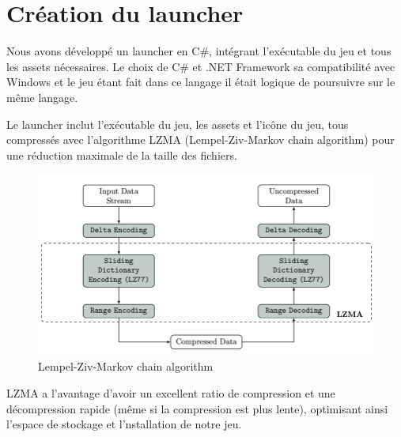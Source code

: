 \documentclass[
	article,			%
	11pt,				%
	oneside,			%
	a4paper,			%
	chapter=TITLE,
	french,			%
	sumario=tradicional
	]{base_nt}
\begin{document}
\newpage

\section{Création du launcher}

Nous avons développé un launcher en C\#, intégrant l'exécutable du jeu et tous les assets nécessaires. Le choix de C\# et .NET Framework sa compatibilité avec Windows et le jeu étant fait dans ce langage il était logique de poursuivre sur le même langage.

Le launcher inclut l'exécutable du jeu, les assets et l'icône du jeu, tous compressés avec l'algorithme LZMA (Lempel-Ziv-Markov chain algorithm) pour une réduction maximale de la taille des fichiers. 

\begin{figure}[ht]
	\caption{Lempel-Ziv-Markov chain
algorithm}
	\centering
	\includegraphics[width=1\linewidth]{paper9.png}
	\legend{}
	
\end{figure}

LZMA a l'avantage d'avoir un excellent ratio de compression et une décompression rapide (même si la compression est plus lente), optimisant ainsi l'espace de stockage et l'nstallation de notre jeu.

\newpage
\end{document}
